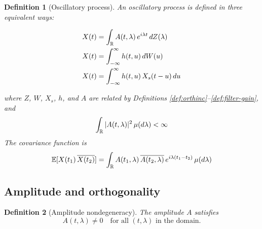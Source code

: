 \documentclass{article}
\newtheorem{definition}{Definition}
\begin{document}
\begin{definition}
  [Oscillatory process]\label{def:oscproc} An oscillatory process is defined
  in three equivalent ways:
  
  \begin{align}
    X (t) & = \int_{\mathbb{R}} A (t, \lambda)  \hspace{0.17em} e^{i \lambda
    t}  \hspace{0.17em} dZ (\lambda)  \label{eq:osc-spectral}\\
    X (t) & = \int_{- \infty}^{\infty} h (t, u)  \hspace{0.17em} dW (u) 
    \label{eq:osc-filter}\\
    X (t) & = \int_{- \infty}^{\infty} h (t, u)  \hspace{0.17em} X_s  (t - u) 
    \hspace{0.17em} du  \label{eq:osc-convolution}
  \end{align}
  
  where $Z$, $W$, $X_s$, $h$, and $A$ are related by Definitions
  \ref{def:orthinc}--\ref{def:filter-gain}, and
  \begin{equation}
    \label{eq:Atlambda-L2-mu} \int_{\mathbb{R}} |A (t, \lambda) |^2 
    \hspace{0.17em} \mu (d \lambda) < \infty
  \end{equation}
  The covariance function is
  \begin{equation}
    \label{eq:covariance} \mathbb{E} [X (t_1) \hspace{0.17em} \overline{X
    (t_2)}] = \int_{\mathbb{R}} A (t_1, \lambda) \hspace{0.17em} \overline{A
    (t_2, \lambda)} \hspace{0.17em} e^{i \lambda (t_1 - t_2)}  \hspace{0.17em}
    \mu (d \lambda)
  \end{equation}
\end{definition}

\subsection{Amplitude and orthogonality}

\begin{definition}
  [Amplitude nondegeneracy]\label{def:nondeg} The amplitude $A$ satisfies
  \begin{equation}
    \label{eq:nonzero} A (t, \lambda) \neq 0 \quad \text{for all $(t,
    \lambda)$ in the domain.}
  \end{equation}
\end{definition}
\end{document}
